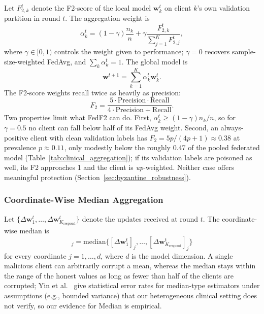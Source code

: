 \documentclass[journal]{IEEEtran}
\begin{document}
Let $F_{2,k}^{t}$ denote the F2-score of the local model $\mathbf{w}_{k}^{t}$ on client $k$'s own validation partition in round $t$. The aggregation weight is
\begin{equation}
\alpha_k^t = (1 - \gamma) \frac{n_k}{n} + \gamma \frac{F_{2,k}^t}{\sum_{j=1}^{K} F_{2,j}^t},
\label{eq:fedf2}
\end{equation}
where $\gamma \in [0, 1)$ controls the weight given to performance; $\gamma = 0$ recovers sample-size-weighted FedAvg, and $\sum_k \alpha_k^t = 1$. The global model is
\begin{equation}
\mathbf{w}^{t+1} = \sum_{k=1}^{K} \alpha_k^t \mathbf{w}_k^t.
\end{equation}
The F2-score weights recall twice as heavily as precision:
\begin{equation}
F_2 = \frac{5 \cdot \text{Precision} \cdot \text{Recall}}{4 \cdot \text{Precision} + \text{Recall}}.
\end{equation}
Two properties limit what FedF2 can do. First, $\alpha_k^t \geq (1-\gamma)n_k/n$, so for $\gamma=0.5$ no client can fall below half of its FedAvg weight. Second, an always-positive client with clean validation labels has $F_2 = 5p/(4p+1) \approx 0.38$ at prevalence $p\approx 0.11$, only modestly below the roughly 0.47 of the pooled federated model (Table~\ref{tab:clinical_aggregation}); if its validation labels are poisoned as well, its F2 approaches 1 and the client is \emph{up}-weighted. Neither case offers meaningful protection (Section~\ref{sec:byzantine_robustness}).

\subsubsection{Coordinate-Wise Median Aggregation}

Let $\{\Delta \mathbf{w}^t_1, \ldots, \Delta \mathbf{w}^t_{K_{\text{respond}}}\}$ denote the updates received at round $t$. The coordinate-wise median is
\begin{equation}
[\text{Median}]_j = \text{median} \{ [\Delta \mathbf{w}^t_1]_j, \ldots, [\Delta \mathbf{w}^t_{K_{\text{respond}}}]_j \}
\end{equation}
for every coordinate $j = 1, \ldots, d$, where $d$ is the model dimension. A single malicious client can arbitrarily corrupt a mean, whereas the median stays within the range of the honest values as long as fewer than half of the clients are corrupted; Yin et al.~\cite{yin2018byzantine} give statistical error rates for median-type estimators under assumptions (e.g., bounded variance) that our heterogeneous clinical setting does not verify, so our evidence for Median is empirical.
\end{document}
